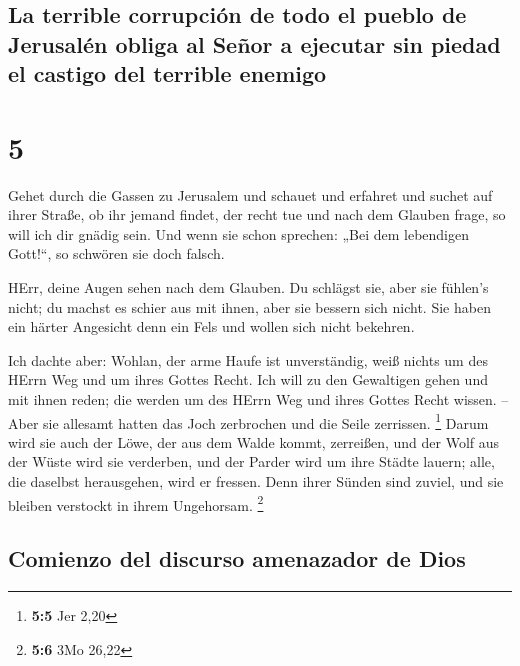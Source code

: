 \hypertarget{la-terrible-corrupciuxf3n-de-todo-el-pueblo-de-jerusaluxe9n-obliga-al-seuxf1or-a-ejecutar-sin-piedad-el-castigo-del-terrible-enemigo}{%
\subsection{La terrible corrupción de todo el pueblo de Jerusalén obliga
al Señor a ejecutar sin piedad el castigo del terrible
enemigo}\label{la-terrible-corrupciuxf3n-de-todo-el-pueblo-de-jerusaluxe9n-obliga-al-seuxf1or-a-ejecutar-sin-piedad-el-castigo-del-terrible-enemigo}}

\hypertarget{section-4}{%
\section{5}\label{section-4}}

 Gehet durch die Gassen zu Jerusalem und schauet und
erfahret und suchet auf ihrer Straße, ob ihr jemand findet, der recht
tue und nach dem Glauben frage, so will ich dir gnädig sein.
 Und wenn sie schon sprechen: „Bei dem lebendigen
Gott!{}``, so schwören sie doch falsch.

 HErr, deine Augen sehen nach dem Glauben. Du schlägst
sie, aber sie fühlen's nicht; du machst es schier aus mit ihnen, aber
sie bessern sich nicht. Sie haben ein härter Angesicht denn ein Fels und
wollen sich nicht bekehren.

 Ich dachte aber: Wohlan, der arme Haufe ist unverständig,
weiß nichts um des HErrn Weg und um ihres Gottes Recht. 
Ich will zu den Gewaltigen gehen und mit ihnen reden; die werden um des
HErrn Weg und ihres Gottes Recht wissen. -- Aber sie allesamt hatten das
Joch zerbrochen und die Seile zerrissen. \footnote{\textbf{5:5} Jer 2,20}
 Darum wird sie auch der Löwe, der aus dem Walde kommt,
zerreißen, und der Wolf aus der Wüste wird sie verderben, und der Parder
wird um ihre Städte lauern; alle, die daselbst herausgehen, wird er
fressen. Denn ihrer Sünden sind zuviel, und sie bleiben verstockt in
ihrem Ungehorsam. \footnote{\textbf{5:6} 3Mo 26,22}

\hypertarget{comienzo-del-discurso-amenazador-de-dios}{%
\subsection{Comienzo del discurso amenazador de
Dios}\label{comienzo-del-discurso-amenazador-de-dios}}


